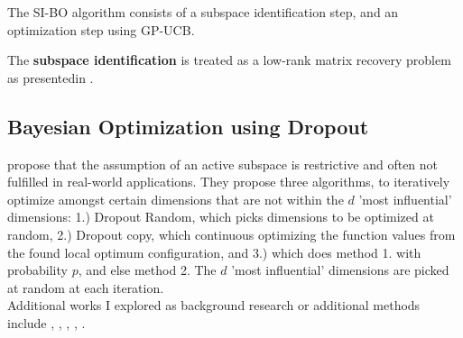 The SI-BO algorithm consists of a subspace identification step, and an optimization step using GP-UCB.


The \textbf{subspace identification} is treated as a low-rank matrix recovery problem as presentedin \citep{CevherSubspaceIdentificationKrause}.



\subsection{Bayesian Optimization using Dropout}

\citep{Li2018} propose that the assumption of an active subspace is restrictive and often not fulfilled in real-world applications.
They propose three algorithms, to iteratively optimize amongst certain dimensions that are not within the $d$ 'most influential' dimensions: 1.) Dropout Random, which picks dimensions to be optimized at random, 2.) Dropout copy, which continuous optimizing the function values from the found local optimum configuration, and 3.) which does method 1. with probability $p$, and else method 2.
The $d$ 'most influential' dimensions are picked at random at each iteration. \\

Additional works I explored as background research or additional methods include \citep{KernelGibbsSampler}, \citep{VirtualVsReal}, \citep{SensorPlacement}, \citep{BatchedBO}, \citep{GPforML}.
